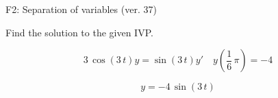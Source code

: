 \begin{exercise}
  \begin{exerciseTitle}F2: Separation of variables (ver. 37)\end{exerciseTitle}
  \begin{exerciseStatement}
    
Find the solution to the given IVP.

    
\[3 \, \cos\left(3 \, t\right) y= \sin\left(3 \, t\right) y'\hspace{1em} y\left( \frac{1}{6} \, \pi \right)= -4\]

  \end{exerciseStatement}
  \begin{exerciseAnswer}
    
\[y= -4 \, \sin\left(3 \, t\right)\]

  \end{exerciseAnswer}
\end{exercise}